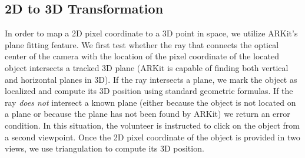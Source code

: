 \documentclass[chi_draft]{sigchi}
\begin{document}
\subsection{2D to 3D Transformation}
In order to map a 2D pixel coordinate to a 3D point in space, we utilize ARKit's plane fitting feature.  We first test whether the ray that connects the optical center of the camera with the location of the pixel coordinate of the located object intersects a tracked 3D plane (ARKit is capable of finding both vertical and horizontal planes in 3D).  If the ray intersects a plane, we mark the object as localized and compute its 3D position using standard geometric formulas.  If the ray \emph{does not} intersect a known plane (either because the object is not located on a plane or because the plane has not been found by ARKit) we return an error condition.  In this situation, the volunteer is instructed to click on the object from a second viewpoint.  Once the 2D pixel coordinate of the object is provided in two views, we use triangulation to compute its 3D position. %
%
%

%
\end{document}
